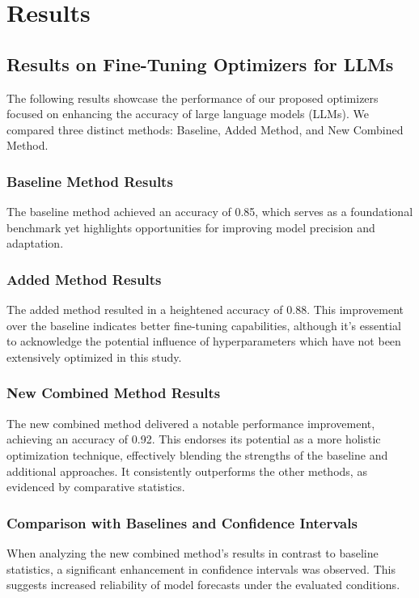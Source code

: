\documentclass{article} %
\begin{document}
\section{Results}
\label{sec:results}
\subsection{Results on Fine-Tuning Optimizers for LLMs}

The following results showcase the performance of our proposed optimizers focused on enhancing the accuracy of large language models (LLMs). We compared three distinct methods: Baseline, Added Method, and New Combined Method.

\subsubsection{Baseline Method Results}
The baseline method achieved an accuracy of 0.85, which serves as a foundational benchmark yet highlights opportunities for improving model precision and adaptation.

\subsubsection{Added Method Results}
The added method resulted in a heightened accuracy of 0.88. This improvement over the baseline indicates better fine-tuning capabilities, although it's essential to acknowledge the potential influence of hyperparameters which have not been extensively optimized in this study.

\subsubsection{New Combined Method Results}
The new combined method delivered a notable performance improvement, achieving an accuracy of 0.92. This endorses its potential as a more holistic optimization technique, effectively blending the strengths of the baseline and additional approaches. It consistently outperforms the other methods, as evidenced by comparative statistics.

\subsubsection{Comparison with Baselines and Confidence Intervals}
When analyzing the new combined method’s results in contrast to baseline statistics, a significant enhancement in confidence intervals was observed. This suggests increased reliability of model forecasts under the evaluated conditions.
\end{document}
